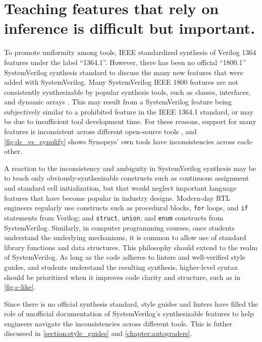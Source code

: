 \FloatBarrier

\section{Teaching features that rely on inference is difficult but important.}



To promote uniformity among tools, IEEE standardized synthesis of Verilog 1364 features under the label \enquote{1364.1}. However, there has been no official \enquote{1800.1} SystemVerilog synthesis standard to discuss the many new features that were added with SystemVerilog. Many SystemVerilog IEEE 1800 features are not consistently synthesizable by popular synthesis tools, such as classes, interfaces, and dynamic arrays \cite{1800-2017, sutherland}. This may result from a SystemVerilog feature being subjectively similar to a prohibited feature in the IEEE 1364.1 standard, or may be due to insufficient tool development time. For these reasons, support for many features is inconsistent across different open-source tools \cite{svtests}, and \autoref{fig:dc_vs_synplify} shows Synopsys' own tools have inconsistencies across each-other.



A reaction to the inconsistency and ambiguity in SystemVerilog synthesis may be to teach only obviously-synthesizable constructs such as continuous assignment and standard cell initialization, but that would neglect important language features that have become popular in industry designs. Modern-day RTL engineers regularly use constructs such as procedural blocks, \texttt{for} loops, and \texttt{if} statements from Verilog; and \texttt{struct}, \texttt{union}, and \texttt{enum} constructs from SystemVerilog. Similarly, in computer programming courses, once students understand the underlying mechanisms, it is common to allow use of standard library functions and data structures. This philosophy should extend to the realm of SystemVerilog. As long as the code adheres to linters and well-verified style guides, and students understand the resulting synthesis, higher-level syntax should be prioritized when it improves code clarity and structure, such as in \autoref{fig:c-like}.

Since there is no official synthesis standard, style guides and linters have filled the role of unofficial documentation of SystemVerilog's synthesizable features to help engineers navigate the inconsistencies across different tools. This is futher discussed in \autoref{section:style_guides} and \autoref{chapter:autograders}.

